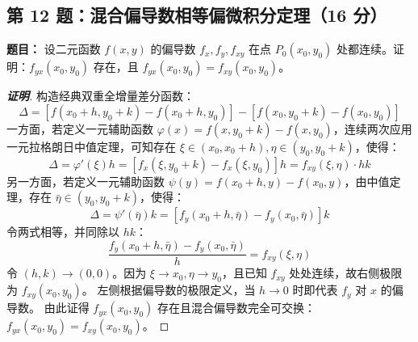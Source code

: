 \documentclass[11pt,a4paper]{article}
\begin{document}
	\begin{tcolorbox}[examstyle]
		\subsection*{第 12 题：混合偏导数相等偏微积分定理（16 分）}
		\textbf{题目：} 设二元函数 $f(x,y)$ 的偏导数 $f_x, f_y, f_{xy}$ 在点 $P_0(x_0,y_0)$ 处都连续。证明：$f_{yx}(x_0,y_0)$ 存在，且 $f_{yx}(x_0,y_0) = f_{xy}(x_0,y_0)$。
		
		\begin{proof}[\textbf{证明}]
			构造经典双重全增量差分函数：
			$$ \Delta = [f(x_0+h, y_0+k) - f(x_0+h, y_0)] - [f(x_0, y_0+k) - f(x_0, y_0)] $$
			一方面，若定义一元辅助函数 $\varphi(x) = f(x, y_0+k) - f(x, y_0)$，连续两次应用一元拉格朗日中值定理，可知存在 $\xi \in (x_0, x_0+h), \eta \in (y_0, y_0+k)$，使得：
			$$ \Delta = \varphi'(\xi)h = [f_x(\xi, y_0+k) - f_x(\xi, y_0)]h = f_{xy}(\xi, \eta) \cdot hk $$
			另一方面，若定义一元辅助函数 $\psi(y) = f(x_0+h, y) - f(x_0, y)$，由中值定理，存在 $\bar{\eta} \in (y_0, y_0+k)$，使得：
			$$ \Delta = \psi'(\bar{\eta})k = [f_y(x_0+h, \bar{\eta}) - f_y(x_0, \bar{\eta})]k $$
			令两式相等，并同除以 $hk$：
			$$ \frac{f_y(x_0+h, \bar{\eta}) - f_y(x_0, \bar{\eta})}{h} = f_{xy}(\xi, \eta) $$
			令 $(h, k) \to (0, 0)$。因为 $\xi \to x_0, \eta \to y_0$，且已知 $f_{xy}$ 处处连续，故右侧极限为 $f_{xy}(x_0,y_0)$。
			左侧根据偏导数的极限定义，当 $h \to 0$ 时即代表 $f_y$ 对 $x$ 的偏导数。
			由此证得 $f_{yx}(x_0,y_0)$ 存在且混合偏导数完全可交换：$f_{yx}(x_0,y_0) = f_{xy}(x_0,y_0)$。
		\end{proof}
	\end{tcolorbox}
	
\end{document}
